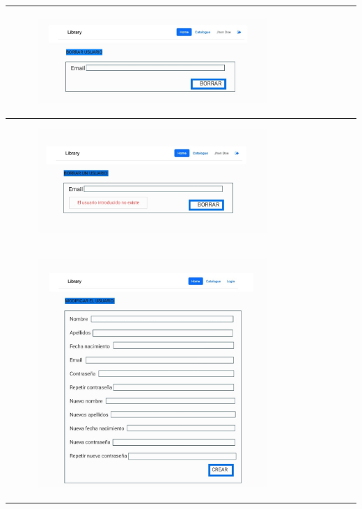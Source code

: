 \documentclass{report}
\begin{document}
\begin{center}
\begin{longtable}{|p{\linewidth}|}
                        \hline
                        \begin{figure}[H]
                            \centering
                            \includegraphics[width=0.8\textwidth]{./img/grafico/BorrarUsu.jpg}
                        \end{figure}\\
                        \hline
                        \begin{figure}[H]
                            \centering
                            \includegraphics[width=0.8\textwidth]{./img/grafico/ErrorBorrarUsu.jpg}
                        \end{figure}\\
                        \hline
                        \begin{figure}[H]
                            \centering
                            \includegraphics[width=0.8\textwidth]{./img/grafico/ModificarUsu.jpg}

\end{figure}
\end{longtable}
\end{center}
\end{document}

